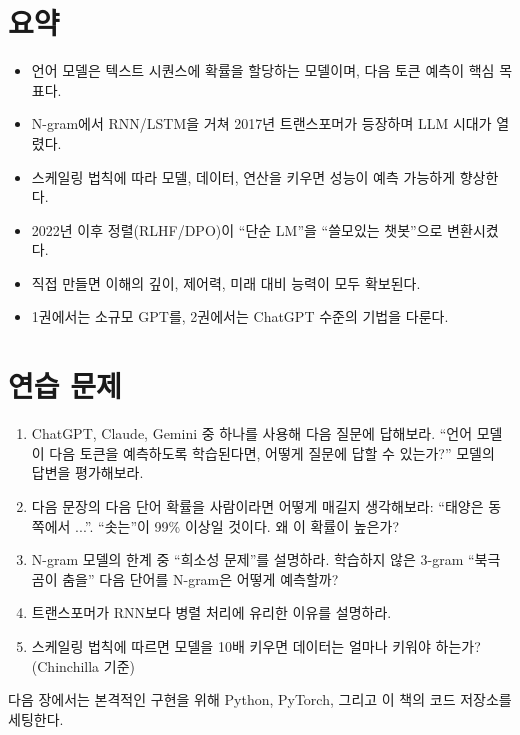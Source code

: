 \section{요약}

\begin{itemize}
  \item 언어 모델은 텍스트 시퀀스에 확률을 할당하는 모델이며, 다음 토큰 예측이 핵심 목표다.
  \item N-gram에서 RNN/LSTM을 거쳐 2017년 트랜스포머가 등장하며 LLM 시대가 열렸다.
  \item 스케일링 법칙에 따라 모델, 데이터, 연산을 키우면 성능이 예측 가능하게 향상한다.
  \item 2022년 이후 정렬(RLHF/DPO)이 ``단순 LM''을 ``쓸모있는 챗봇''으로 변환시켰다.
  \item 직접 만들면 이해의 깊이, 제어력, 미래 대비 능력이 모두 확보된다.
  \item 1권에서는 소규모 GPT를, 2권에서는 ChatGPT 수준의 기법을 다룬다.
\end{itemize}

\section{연습 문제}

\begin{enumerate}
  \item ChatGPT, Claude, Gemini 중 하나를 사용해 다음 질문에 답해보라. ``언어 모델이 다음 토큰을 예측하도록 학습된다면, 어떻게 질문에 답할 수 있는가?'' 모델의 답변을 평가해보라.
  \item 다음 문장의 다음 단어 확률을 사람이라면 어떻게 매길지 생각해보라: ``태양은 동쪽에서 ...''. ``솟는''이 99\% 이상일 것이다. 왜 이 확률이 높은가?
  \item N-gram 모델의 한계 중 ``희소성 문제''를 설명하라. 학습하지 않은 3-gram ``북극곰이 춤을'' 다음 단어를 N-gram은 어떻게 예측할까?
  \item 트랜스포머가 RNN보다 병렬 처리에 유리한 이유를 설명하라.
  \item 스케일링 법칙에 따르면 모델을 10배 키우면 데이터는 얼마나 키워야 하는가? (Chinchilla 기준)
\end{enumerate}

다음 장에서는 본격적인 구현을 위해 Python, PyTorch, 그리고 이 책의 코드 저장소를 세팅한다.
